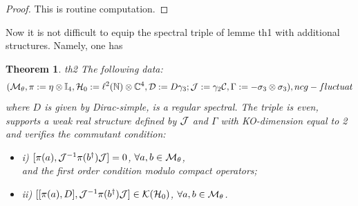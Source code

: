 \documentclass[10pt]{book}
\theoremstyle{break}
\newtheorem{theorem}{Theorem}
\begin{document}
\begin{proof}
This is routine computation.
\end{proof}
Now it is not difficult to equip the spectral triple of lemme {th1} with additional structures. Namely, one has
\begin{theorem}{th2}
The following data:
 \begin{equation*}
({\cal{M}}_\theta,\pi:=\eta\otimes\mathbb{I}_4,{\cal{H}}_0:=\ell^2(\mathbb{N})\otimes\mathbb{C}^4,{\cal{D}}:=D\gamma_3;{\cal{J}}:=\gamma_2{\cal{C}},\Gamma:=-\sigma_3\otimes\sigma_3),{ncg-fluctuat}
\end{equation*}
where $D$ is given by {Dirac-simple}, is a regular spectral. The triple is even, supports a weak real structure defined by ${\cal{J}}$ and $\Gamma$ with KO-dimension equal to 2 and verifies the commutant condition:
\begin{itemize}
\vspace*{-4pt}
\setlength{\itemsep}{-1pt}
\item i) $[\pi(a),{\cal{J}}^{-1}\pi(b^\dag){\cal{J}}]=0$, $\forall a,b\in{\cal{M}}_\theta$,\\
and the first order condition modulo compact operators;
\item ii) $[[\pi(a),D],{\cal{J}}^{-1}\pi(b^\dag){\cal{J}}]\in{\cal{K}}({\cal{H}}_0)$, $\forall a,b\in{\cal{M}}_\theta$.
\end{itemize}
\end{theorem}
\end{document}
